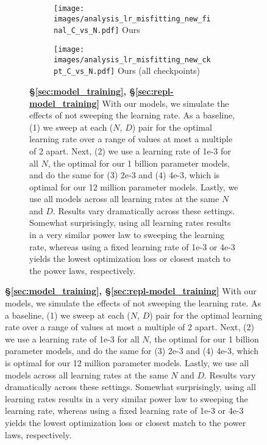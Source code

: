 \begin{figure}[]
\ContinuedFloat 
    \centering
\begin{subfigure}{\textwidth}
\begin{subfigure}{0.49\textwidth}
    \centering
    \texttt{[image: images/analysis\_lr\_misfitting\_new\_final\_C\_vs\_N.pdf]}
    \footnotesize{Ours}
\end{subfigure}
    \hfill
\begin{subfigure}{0.49\textwidth}
    \centering
    \texttt{[image: images/analysis\_lr\_misfitting\_new\_ckpt\_C\_vs\_N.pdf]}
    \footnotesize{Ours (all checkpoints)}
\end{subfigure}
    \caption{\textbf{\S\ref{sec:model_training}, \S\ref{sec:repl-model_training}} With our models, we simulate the effects of not sweeping the learning rate. As a baseline, (1) we sweep at each ($N$, $D$) pair for the optimal learning rate over a range of values at most a multiple of 2 apart. Next, (2) we use a learning rate of 1e-3 for all $N$, the optimal for our 1 billion parameter models, and do the same for (3) 2e-3 and (4) 4e-3, which is optimal for our 12 million parameter models. Lastly, we use all models across all learning rates at the same $N$ and $D$. Results vary dramatically across these settings. Somewhat surprisingly, using all learning rates results in a very similar power law to sweeping the learning rate, whereas using a fixed learning rate of 1e-3 or 4e-3 yields the lowest optimization loss or closest match to the \citet{hoffmann2022training} power laws, respectively.}
\end{subfigure}
\end{figure}


